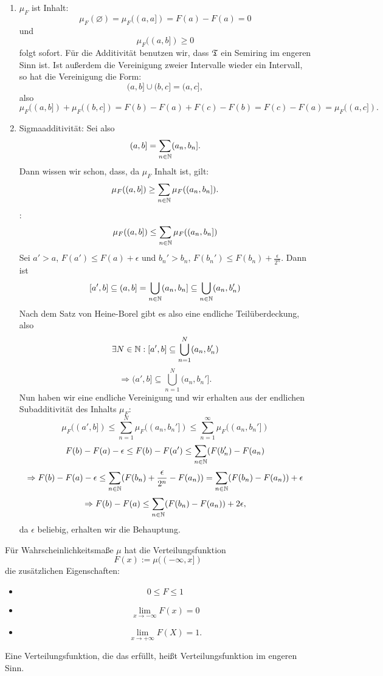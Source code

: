 			\begin{bew}$\text{  }$
				\begin{enumerate}
					\item $\mu_F$ ist Inhalt:\newline
					\[ \mu_F(\varnothing)=\mu_F((a,a])=F(a)-F(a)=0 \]
					und
					\[ \mu_F((a,b])\geq 0 \]
					folgt sofort. Für die Additivität benutzen wir, dass $\mathfrak{T}$ ein Semiring im engeren Sinn ist. Ist außerdem die Vereinigung zweier Intervalle wieder ein Intervall, so hat die Vereinigung die Form:
					\[ (a,b]\cup (b,c]=(a,c], \]
					also
					\[ \mu_F((a,b])+\mu_F((b,c])=F(b)-F(a)+F(c)-F(b)=F(c)-F(a)=\mu_F((a,c]). \]
					\item Sigmaadditivität:\newline
					Sei also 
					\[ (a,b]=\sum_{n\in\mathbb{N}} (a_n,b_n]. \]
					Dann wissen wir schon, dass, da $\mu_F$ Inhalt ist, gilt:
					\[ \mu_F((a,b])\ge\sum_{n\in\mathbb{N}} \mu_F((a_n,b_n]). \]
					\zz:
					\[ \mu_F((a,b])\le\sum_{n\in\mathbb{N}} \mu_F((a_n,b_n]) \]
					Sei $a'>a$, $F(a')\le F(a)+\epsilon$ und $b_n'>b_n$, $F(b_n')\le F(b_n)+\frac{\epsilon}{2^n}$. Dann ist
					\[ [a',b]\subseteq (a,b]=\bigcup_{n\in\mathbb{N}}(a_n,b_n]\subseteq \bigcup_{n\in\mathbb{N}} (a_n,b_n') \]
					Nach dem Satz von Heine-Borel gibt es also eine endliche Teilüberdeckung, also
					\[ \exists N\in\mathbb{N}: [a',b]\subseteq\bigcup_{n=1}^N(a_n,b_n') \]
					\[ \Rightarrow (a',b]\subseteq\bigcup_{n=1}^N (a_n,b_n']. \]
					Nun haben wir eine endliche Vereinigung und wir erhalten aus der endlichen Subadditivität des Inhalts $\mu_F$:
					\[ \mu_F((a',b])\le\sum_{n=1}^{N}\mu_F((a_n,b_n'])\le\sum_{n=1}^{\infty}\mu_F((a_n,b_n']) \]
					\[ F(b)-F(a)-\epsilon\le F(b)-F(a')\le\sum_{n\in\mathbb{N}}(F(b_n')-F(a_n) \]
					\[ \Rightarrow F(b)-F(a)-\epsilon\le\sum_{n\in\mathbb{N}} (F(b_n)+\frac{\epsilon}{2^n}-F(a_n))=\sum_{n\in\mathbb{N}}(F(b_n)-F(a_n))+\epsilon \]
					\[ \Rightarrow F(b)-F(a)\le \sum_{n\in\mathbb{N}}(F(b_n)-F(a_n))+2\epsilon, \]
					da $\epsilon$ beliebig, erhalten wir die Behauptung. 
					
				\end{enumerate}
			\end{bew}
			
			\begin{bem}
				Für Wahrscheinlichkeitsmaße $\mu$ hat die Verteilungsfunktion 
				\[ F(x):=\mu((-\infty,x]) \]
				die zusätzlichen Eigenschaften:
				\begin{itemize}
					\item
					\[ 0\le F\le 1 \]
					\item
					\[ \lim_{x\to-\infty}F(x)=0 \]
					\item
					\[ \lim_{x\to +\infty} F(X)=1. \]
				\end{itemize}
				Eine Verteilungsfunktion, die das erfüllt, heißt Verteilungsfunktion im engeren Sinn. 
			\end{bem}
			
